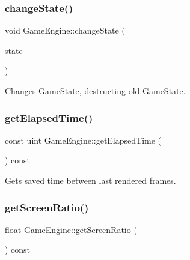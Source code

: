 \subsubsection{\texorpdfstring{changeState()}{changeState()}}
{\footnotesize\ttfamily void Game\+Engine\+::change\+State (\begin{DoxyParamCaption}\item[{\mbox{\hyperlink{class_game_state}{Game\+State}} $\ast$}]{state }\end{DoxyParamCaption})}



Changes \mbox{\hyperlink{class_game_state}{Game\+State}}, destructing old \mbox{\hyperlink{class_game_state}{Game\+State}}. 

\mbox{\label{class_game_engine_a83d4cc180c4ad2c7db5224ce840140e1}} 
\subsubsection{\texorpdfstring{getElapsedTime()}{getElapsedTime()}}
{\footnotesize\ttfamily const uint Game\+Engine\+::get\+Elapsed\+Time (\begin{DoxyParamCaption}{ }\end{DoxyParamCaption}) const\hspace{0.3cm}{\ttfamily [inline]}}



Gets saved time between last rendered frames. 

\mbox{\label{class_game_engine_a6328d97829e7f0a79a5672c5dd040592}} 
\subsubsection{\texorpdfstring{getScreenRatio()}{getScreenRatio()}}
{\footnotesize\ttfamily float Game\+Engine\+::get\+Screen\+Ratio (\begin{DoxyParamCaption}{ }\end{DoxyParamCaption}) const\hspace{0.3cm}{\ttfamily [inline]}}

\mbox{\label{class_game_engine_a77d8443f4919f8eca96acfb40e6b64bd}} 
